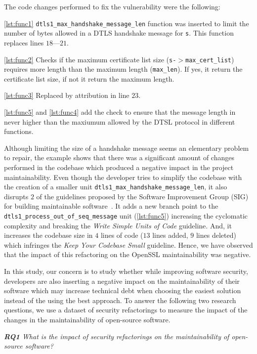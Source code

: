 \documentclass[10pt,conference]{IEEEtran}
\begin{document}
The code changes performed to fix the vulnerability were the following:

\ref{lst:func1} \texttt{dtls1\_max\_handshake\_message\_len} function was
inserted to limit the number of bytes allowed in a DTLS handshake message for
\texttt{s}. This function replaces lines $18$---$21$.

\ref{lst:func2} Checks if the maximum certificate list size
(\texttt{s-$>$max\_cert\_list}) requires more length than the maximum length
(\texttt{max\_len}). If yes, it return the certificate list size, if not it
return the maximum length.

\ref{lst:func3} Replaced by attribution in line $23$.

\ref{lst:func5} and \ref{lst:func4} add the check to ensure that the message
length in never higher than the maxiumum allowed by the DTSL protocol in
different functions.

Although limiting the size of a handshake message seems an elementary problem to
repair, the example shows that there was a significant amount of changes
performed in the codebase which produced a negative impact in the project
maintainability. Even though the developer tries to simplify the codebase with
the creation of a smaller unit \texttt{dtls1\_max\_handshake\_message\_len}, it
also disrupts $2$ of the guidelines proposed by the Software Improvement Group
(SIG) for building maintainable software~\cite{Visser:2016:OREILLY}. It adds a
new branch point to the \texttt{dtls1\_process\_out\_of\_seq\_message} unit
(\ref{lst:func5}) increasing the cyclomatic complexity and breaking the
\emph{Write Simple Units of Code} guideline. And, it increases the codebase size
in $4$ lines of code ($13$ lines added, $9$ lines deleted) which infringes the
\emph{Keep Your Codebase Small} guideline. Hence, we have observed that the
impact of this refactoring on the OpenSSL maintainability was negative.

In this study, our concern is to study whether while improving software
security, developers are also inserting a negative impact on the maintainability
of their software which may increase technical debt when choosing the easiest
solution instead of the using the best approach. To answer the following two
research questions, we use a dataset of security refactorings to measure the
impact of the changes in the maintainability of open-source software.

\begin{framed}
\textit{\textbf{RQ1} What is the impact of security refactorings on the
maintainability of open-source software?}
\end{framed}
\end{document}
